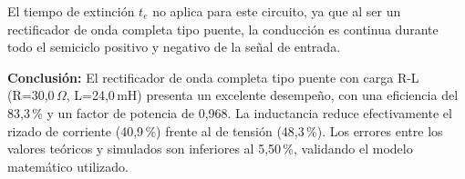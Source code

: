 \documentclass[12pt,a4paper]{article}
\begin{document}
El tiempo de extinción $t_e$ no aplica para este circuito, ya que al ser un rectificador
de onda completa tipo puente, la conducción es continua durante todo el semiciclo
positivo y negativo de la señal de entrada.

\textbf{Conclusión:} El rectificador de onda completa tipo puente con carga R-L
(R=30{,}0\,$\Omega$, L=24{,}0\,mH) presenta un excelente desempeño, con una eficiencia del
83{,}3\,\% y un factor de potencia de 0,968. La inductancia reduce efectivamente el
rizado de corriente (40,9\,\%) frente al de tensión (48,3\,\%). Los errores entre los
valores teóricos y simulados son inferiores al 5,50\,\%, validando el modelo matemático
utilizado.
\end{document}
